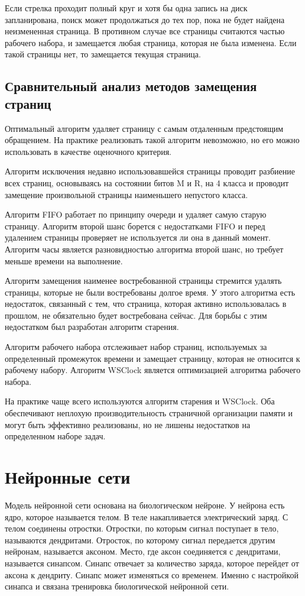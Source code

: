 Если стрелка проходит полный круг и хотя бы одна запись на диск запланирована, поиск может продолжаться до тех пор, пока не будет найдена неизмененная страница.
В противном случае все страницы считаются частью рабочего набора, и замещается любая страница, которая не была изменена.
Если такой страницы нет, то замещается текущая страница.

\subsection{Сравнительный анализ методов замещения страниц}

Оптимальный алгоритм удаляет страницу с самым отдаленным предстоящим обращением. 
На практике реализовать такой алгоритм невозможно, но его можно использовать в качестве оценочного критерия.

Алгоритм исключения недавно использовавшейся страницы проводит разбиение всех страниц, основываясь на состоянии битов M и R, на 4 класса и проводит замещение произвольной страницы наименьшего непустого класса.

Алгоритм FIFO работает по принципу очереди и удаляет самую старую страницу.
Алгоритм второй шанс борется с недостатками FIFO и перед удалением страницы проверяет не используется ли она в данный момент.
Алгоритм часы является разновидностью алгоритма второй шанс, но требует меньше времени на выполнение.

Алгоритм замещения наименее востребованной страницы стремится удалять страницы, которые не были востребованы долгое время. 
У этого алгоритма есть недостаток, связанный с тем, что страница, которая активно использовалась в прошлом, не обязательно будет востребована сейчас. 
Для борьбы с этим недостатком был разработан алгоритм старения.

Алгоритм рабочего набора отслеживает набор страниц, используемых за определенный промежуток времени и замещает страницу, которая не относится к рабочему набору.
Алгоритм WSClock является оптимизацией алгоритма рабочего набора.

На практике чаще всего используются алгоритм старения и WSClock.
Оба обеспечивают неплохую производительность страничной организации памяти и могут быть эффективно реализованы, но не лишены недостатков на определенном наборе задач.

\section{Нейронные сети}\label{sec:neuro_net}
Модель нейронной сети основана на биологическом нейроне.
У нейрона есть ядро, которое называется телом. 
В теле накапливается электрический заряд.
С телом соединены отростки.
Отростки, по которым сигнал поступает в тело, называются дендритами. 
Отросток, по которому сигнал передается другим нейронам, называется аксоном. 
Место, где аксон соединяется с дендритами, называется синапсом. 
Синапс отвечает за количество заряда, которое перейдет от аксона к дендриту. 
Синапс может изменяться со временем. 
Именно с настройкой синапса и связана тренировка биологической нейронной сети.

